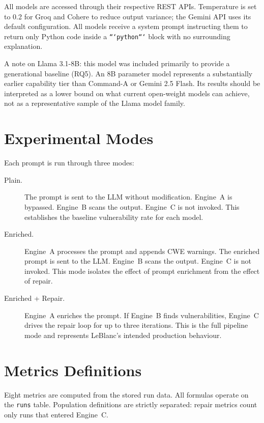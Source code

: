 \documentclass[12pt,a4paper]{report}
\begin{document}
All models are accessed through their respective REST APIs. Temperature is set
to 0.2 for Groq and Cohere to reduce output variance; the Gemini API uses its
default configuration. All models receive a system prompt instructing them to
return only Python code inside a \texttt{```python```} block with no surrounding
explanation.

A note on Llama 3.1-8B: this model was included primarily to provide a
generational baseline (RQ5). An 8B parameter model represents a substantially
earlier capability tier than Command-A or Gemini 2.5 Flash. Its results should
be interpreted as a lower bound on what current open-weight models can achieve,
not as a representative sample of the Llama model family.

\section{Experimental Modes}
\label{sec:modes}

Each prompt is run through three modes:

\begin{description}
  \item[Plain.] The prompt is sent to the LLM without modification. Engine~A
        is bypassed. Engine~B scans the output. Engine~C is not invoked.
        This establishes the baseline vulnerability rate for each model.

  \item[Enriched.] Engine~A processes the prompt and appends CWE warnings.
        The enriched prompt is sent to the LLM. Engine~B scans the output.
        Engine~C is not invoked. This mode isolates the effect of prompt
        enrichment from the effect of repair.

  \item[Enriched + Repair.] Engine~A enriches the prompt. If Engine~B finds
        vulnerabilities, Engine~C drives the repair loop for up to three
        iterations. This is the full pipeline mode and represents LeBlanc's
        intended production behaviour.
\end{description}

\section{Metrics Definitions}
\label{sec:metrics}

Eight metrics are computed from the stored run data. All formulas operate on the
\texttt{runs} table. Population definitions are strictly separated: repair metrics
count only runs that entered Engine~C.
\end{document}
